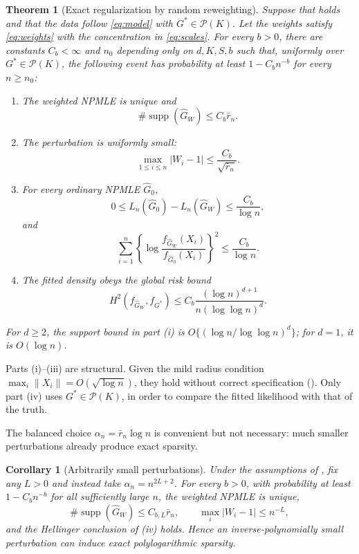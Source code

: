 \documentclass[11pt]{article}
\newtheorem{theorem}{Theorem}
\newtheorem{corollary}{Corollary}
\theoremstyle{definition}
\theoremstyle{remark}
\DeclareMathOperator{\supp}{supp}
\newcommand{\Pcal}{\mathcal P}
\newcommand{\norm}[1]{\lVert #1\rVert}
\newcommand{\abs}[1]{\lvert #1\rvert}
\newcommand{\Ghat}{\widehat G}
\begin{document}
\begin{theorem}[Exact regularization by random reweighting]
\label{thm:main}
Suppose that  holds and that the data follow
\eqref{eq:model} with $G^*\in\Pcal(K)$.  Let the weights satisfy
\eqref{eq:weights} with the concentration in \eqref{eq:scales}.  For every
$b>0$, there are constants $C_b<\infty$ and $n_0$ depending only on
$d,K,S,b$ such that, uniformly over $G^*\in\Pcal(K)$, the following event has
probability at least $1-C_bn^{-b}$ for every $n\ge n_0$:
\begin{enumerate}[label=\textup{(\roman*)}]
\item The weighted NPMLE is unique and
\[
  \#\supp(\Ghat_W)\le C_b\bar r_n.
\]
\item The perturbation is uniformly small:
\[
  \max_{1\le i\le n}\abs{W_i-1}\le \frac{C_b}{\sqrt{\bar r_n}}.
\]
\item For every ordinary NPMLE $\Ghat_0$,
\[
  0\le L_n(\Ghat_0)-L_n(\Ghat_W)\le\frac{C_b}{\log n},
\]
and
\[
 \sum_{i=1}^n
 \left\{\log\frac{f_{\Ghat_W}(X_i)}{f_{\Ghat_0}(X_i)}\right\}^2
 \le\frac{C_b}{\log n}.
\]
\item The fitted density obeys the global risk bound
\[
 H^2(f_{\Ghat_W},f_{G^*})
 \le C_b\frac{(\log n)^{d+1}}
 {n(\log\log n)^d}.
\]
\end{enumerate}
For $d\ge2$, the support bound in part \textup{(i)} is
$O\{(\log n/\log\log n)^d\}$; for $d=1$, it is $O(\log n)$.
\end{theorem}

Parts (i)--(iii) are structural.  Given the mild radius condition
$\max_i\norm{X_i}=O(\sqrt{\log n})$, they hold without correct specification
().  Only part (iv) uses $G^*\in\Pcal(K)$, in order to
compare the fitted likelihood with that of the truth.

The balanced choice $\alpha_n=\bar r_n\log n$ is convenient but not
necessary: much smaller perturbations already produce exact sparsity.

\begin{corollary}[Arbitrarily small perturbations]
\label{cor:tiny}
Under the assumptions of , fix any $L>0$ and instead take
$\alpha_n=n^{2L+2}$.  For every $b>0$, with probability at least
$1-C_bn^{-b}$ for all sufficiently large $n$, the weighted NPMLE is unique,
\[
 \#\supp(\Ghat_W)\le C_{b,L}\bar r_n,
 \qquad
 \max_i\abs{W_i-1}\le n^{-L},
\]
and the Hellinger conclusion of (iv) holds.  Hence an
inverse-polynomially small perturbation can induce exact polylogarithmic
sparsity.
\end{corollary}
\end{document}
